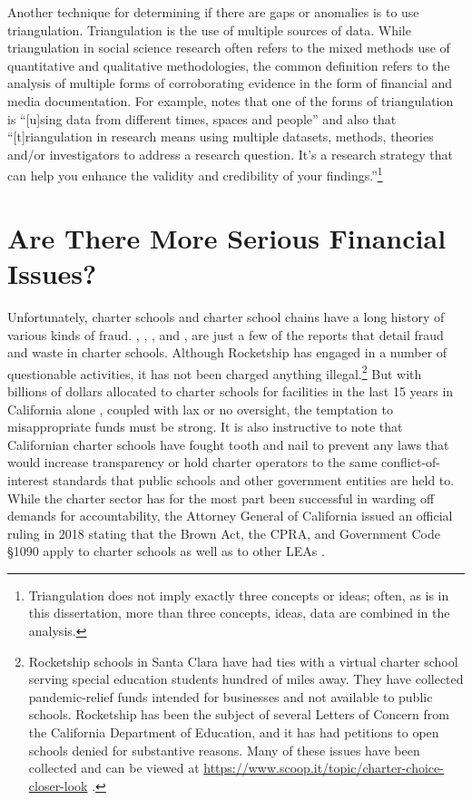 Another technique for determining if there are gaps or anomalies is to use triangulation. Triangulation is the use of multiple sources of data. While triangulation in social science research often refers to the mixed methods use of quantitative and qualitative methodologies, the common definition refers to the analysis of multiple forms of corroborating evidence in the form of financial and media documentation. For example,  \textcite{Bhandari2022} notes that one of the forms of triangulation is ``[u]sing data from different times, spaces and people'' and also that ``[t]riangulation in research means using multiple datasets, methods, theories and/or investigators to address a research question. It’s a research strategy that can help you enhance the validity and credibility of your findings.''\footnote{Triangulation does not imply exactly three concepts or ideas; often, as is in this dissertation, more than three concepts, ideas, data are combined in the analysis.}

\section{Are There More Serious Financial Issues?}\label{serious-problems}\indent

Unfortunately, charter schools and charter school chains have a long history of various kinds of fraud. \textcite{Lafer2017}, \textcite{ITPT2018}, \textcite{Burris.etal2020}, and \textcite{Burris.Bryant2020}, are just a few of the reports that detail fraud and waste in charter schools. Although Rocketship has engaged in a number of questionable activities, it has not been charged anything illegal.\footnote{Rocketship schools in Santa Clara have had ties with a virtual charter school serving special education students hundred of miles away. They have collected pandemic-relief funds intended for businesses and not available to public schools. Rocketship has been the subject of several Letters of Concern from the California Department of Education, and it has had petitions to open schools denied for substantive reasons. Many of these issues have been collected and can be viewed at \url{https://www.scoop.it/topic/charter-choice-closer-look} \parencite{Marachi2022}.} But with billions of dollars allocated to charter schools for facilities in the last 15 years in California alone \parencite[4]{Lafer2017}, coupled with lax or no oversight, the temptation to misappropriate funds must be strong. It is also instructive to note that Californian charter schools have fought tooth and nail to prevent any laws that would increase transparency or hold charter operators to the same conflict-of-interest standards that public schools and other government entities are held to. While the charter sector has for the most part been successful in warding off demands for accountability, the Attorney General of California issued an official ruling in 2018 stating that the Brown Act, the CPRA, and Government Code §1090 apply to charter schools as well as to other LEAs \parencite{Becerra.Medeiros2018}.

